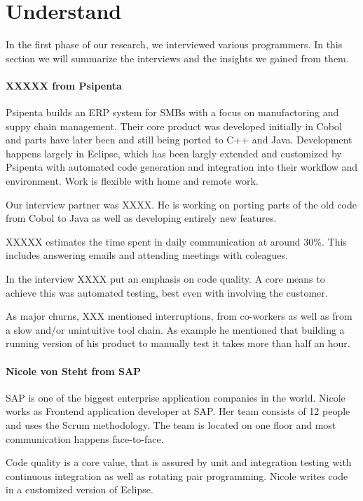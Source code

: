 \section{Understand}
\label{sec:understand}
In the first phase of our research, we interviewed various programmers. In this section we will summarize the interviews and the insights we gained from them.

\paragraph{XXXXX from Psipenta}
Psipenta builds an ERP system for SMBs with a focus on manufactoring and suppy chain management. Their core product was developed initially in Cobol and parts have later been and still being ported to C++ and Java. Development happens largely in Eclipse, which has been largly extended and customized by Psipenta with automated code generation and integration into their workflow and environment. Work is flexible with home and remote work.

Our interview partner was XXXX. He is working on porting parts of the old code from Cobol to Java as well as developing entirely new features.

XXXXX estimates the time spent in daily communication at around 30\%. This includes answering emails and attending meetings with coleagues.

In the interview XXXX put an emphasis on code quality. A core means to achieve this was automated testing, best even with involving the customer.

As major churns, XXX mentioned interruptions, from co-workers as well as from a slow and/or unintuitive tool chain. As example he mentioned that building a running version of his product to manually test it takes more than half an hour.

\paragraph{Nicole von Steht from SAP}
SAP is one of the biggest enterprise application companies in the world. Nicole works as Frontend application developer at SAP. Her team consists of 12 people and uses the Scrum methodology. The team is located on one floor and most communication happens face-to-face.

Code quality is a core value, that is assured by unit and integration testing with continuous integration as well as rotating pair programming. Nicole writes code in a customized version of Eclipse.

